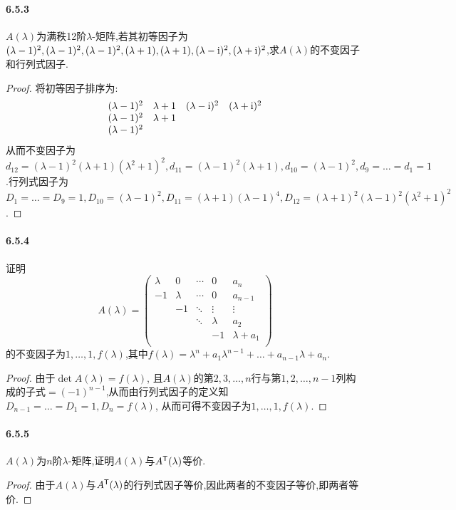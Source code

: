 \documentclass[11pt]{article}
\begin{document}
\paragraph{6.5.3}$A(\lambda)$为满秩12阶$\lambda$-矩阵,若其初等因子为$(\lambda-1)^2,(\lambda-1)^2,(\lambda-1)^2,(\lambda+1),(\lambda+1),(\lambda-\mathrm{i})^2,(\lambda+\mathrm{i})^2$,求$A(\lambda)$的不变因子和行列式因子.
\begin{proof}
    将初等因子排序为:
    $$\begin{array}{cccc}
        (\lambda -1)^2 & \lambda +1 & (\lambda -\mathrm{i})^2 & (\lambda +\mathrm{i})^2 \\
        (\lambda -1)^2 & \lambda +1 &  &  \\
        (\lambda -1)^2 &  &  &  \\
    \end{array}$$
    从而不变因子为$d_{12}=(\lambda-1)^2(\lambda+1)(\lambda^2+1)^2, d_{11}=(\lambda-1)^2(\lambda+1), d_{10}=(\lambda-1)^2, d_9=\dots=d_1=1$.行列式因子为$D_1=\dots=D_9=1,D_{10}=(\lambda-1)^2, D_{11}=(\lambda+1)(\lambda-1)^4, D_{12}=(\lambda+1)^2(\lambda-1)^2(\lambda^2+1)^2$.
\end{proof}
\paragraph{6.5.4}证明
$$A(\lambda)=\begin{pmatrix}
    \lambda  & 0 & \cdots & 0 & a_n \\
    -1 & \lambda  & \cdots & 0 & a_{n-1} \\
     & -1 & \ddots & \vdots & \vdots \\
     &  & \ddots & \lambda  & a_2 \\
     &  &  & -1 & \lambda+a_1  \\
\end{pmatrix}$$
的不变因子为$1,\dots,1,f(\lambda)$,其中$f(\lambda)=\lambda^n+a_1\lambda^{n-1}+\dots+a_{n-1}\lambda+a_n$.
\begin{proof}
    由于$\det A(\lambda)=f(\lambda)$, 且$A(\lambda)$的第$2,3,\dots,n$行与第$1,2,\dots,n-1$列构成的子式$=(-1)^{n-1}$,从而由行列式因子的定义知$D_{n-1}=\dots=D_1=1, D_n=f(\lambda)$, 从而可得不变因子为$1,\dots,1,f(\lambda)$.
\end{proof}
\paragraph{6.5.5}$A(\lambda)$为$n$阶$\lambda$-矩阵,证明$A(\lambda)$与$A^{\mathsf{T}}(\lambda)$等价.
\begin{proof}
    由于$A(\lambda)$与$A^{\mathsf{T}}(\lambda)$的行列式因子等价,因此两者的不变因子等价,即两者等价.
\end{proof}
\end{document}
